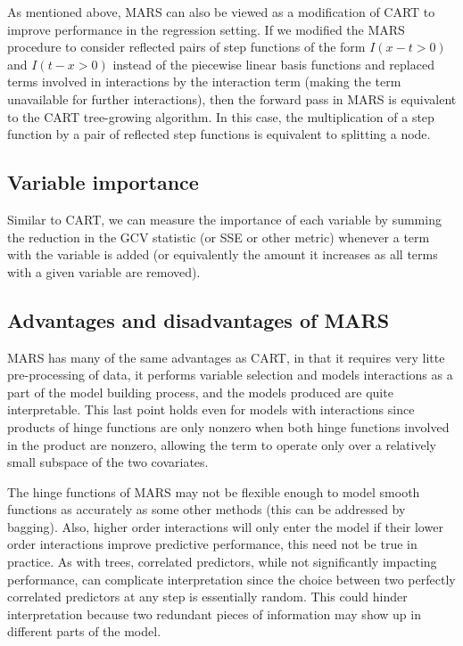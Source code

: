 \documentclass[12pt]{article}
\begin{document}
As mentioned above, MARS can also be viewed as a modification of CART to improve performance in the regression setting. If we modified the MARS procedure to consider reflected pairs of step functions of the form $I(x - t > 0)$ and $I(t - x > 0)$ instead of the piecewise linear basis functions and replaced terms involved in interactions by the interaction term (making the term unavailable for further interactions), then the forward pass in MARS is equivalent to the CART tree-growing algorithm. In this case, the multiplication of a step function by a pair of reflected step functions is equivalent to splitting a node.


\subsection{Variable importance} %
\label{sub:variable_importance}

Similar to CART, we can measure the importance of each variable by summing the reduction in the GCV statistic (or SSE or other metric) whenever a term with the variable is added (or equivalently the amount it increases as all terms with a given variable are removed).


\subsection{Advantages and disadvantages of MARS} %
\label{sub:advantages_of_mars}

MARS has many of the same advantages as CART, in that it requires very litte pre-processing of data, it performs variable selection and models interactions as a part of the model building process, and the models produced are quite interpretable. This last point holds even for models with interactions since products of hinge functions are only nonzero when both hinge functions involved in the product are nonzero, allowing the term to operate only over a relatively small subspace of the two covariates.

The hinge functions of MARS may not be flexible enough to model smooth functions as accurately as some other methods (this can be addressed by bagging). Also, higher order interactions will only enter the model if their lower order interactions improve predictive performance, this need not be true in practice. As with trees, correlated predictors, while not significantly impacting performance, can complicate interpretation since the choice between two perfectly correlated predictors at any step is essentially random. This could hinder interpretation because two redundant pieces of information may show up in different parts of the model.
\end{document}
